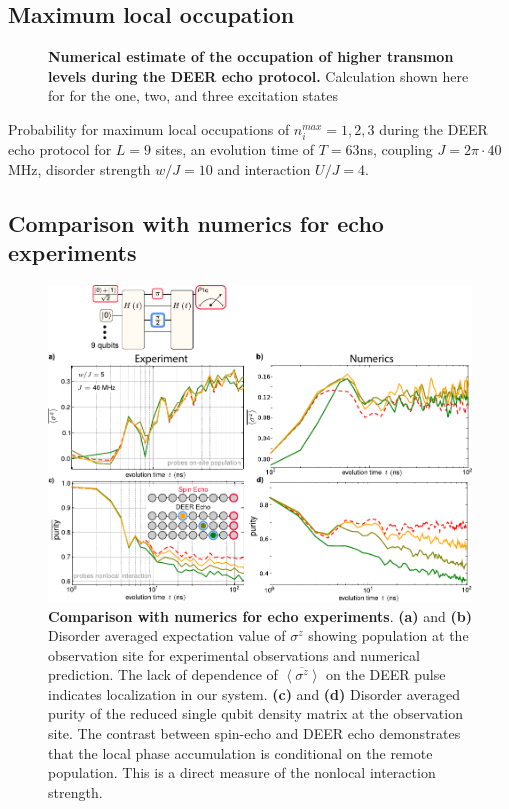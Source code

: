 \subsection{Maximum local occupation}
\begin{figure}
\centering
{}
\caption{\textbf{Numerical estimate of the occupation of higher transmon levels during the DEER echo protocol.} Calculation shown here for for the one, two, and three excitation states}
\label{figLocalOcc}
\end{figure}
Probability for maximum local occupations of $n_i^{max} = 1,2,3$ during the DEER echo protocol for $L=9$ sites, an evolution time of $T=63$ns, coupling $J=2\pi \cdot 40$MHz, disorder strength $w/J=10$ and interaction $U/J=4$.

\subsection{Comparison with numerics for echo experiments}
\begin{figure}
\centering
\includegraphics[width=140mm, keepaspectratio]{./PDF/echo_numerics_comparison_190919_944a.pdf}
\caption{\textbf{Comparison with numerics for echo experiments}.
\textbf{(a)} and \textbf{(b)} Disorder averaged expectation value of $\sigma^z$ showing population at the observation site for experimental observations and numerical prediction.
The lack of dependence of $\overline{ \left< \sigma^z \right> }$ on the DEER pulse indicates localization in our system.
\textbf{(c)} and \textbf{(d)} Disorder averaged purity of the reduced single qubit density matrix at the observation site.
The contrast between spin-echo and DEER echo demonstrates that the local phase accumulation is conditional on the remote population.
This is a direct measure of the nonlocal interaction strength.}
\end{figure}

